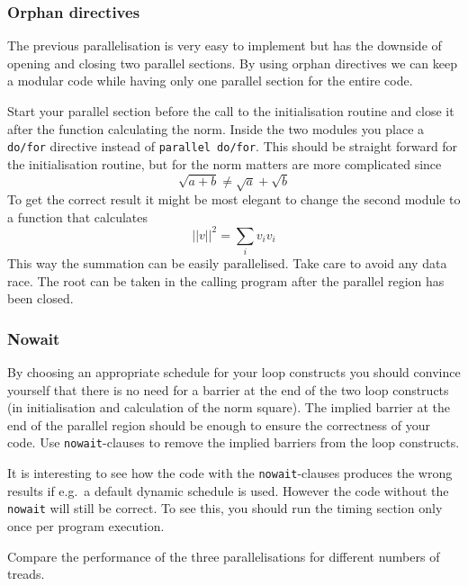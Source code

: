 \subsubsection{Orphan directives}
The previous parallelisation is very easy to implement but has the downside of opening and closing two parallel sections.  By using orphan directives we can keep a modular code while having only one parallel section for the entire code.

Start your parallel section before the call to the initialisation routine and close it after the function calculating the norm.  Inside the two modules you place a \verb+do/for+ directive instead of \verb+parallel do/for+.  This should be straight forward for the initialisation routine, but for the norm matters are more complicated since
\begin{equation}
\sqrt{a+b} \ne \sqrt a + \sqrt b
\end{equation}
To get the correct result it might be most elegant to change the second module to a function that calculates 
\begin{equation}
|| v ||^2 = \sum_i v_i v_i
\end{equation}
This way the summation can be easily parallelised.  Take care to avoid any data race.  The root can be taken in the calling program after the parallel region has been closed.

\subsubsection{Nowait}
By choosing an appropriate schedule for your loop constructs you should convince yourself that there is no need for a barrier at the end of the two loop constructs (in initialisation and calculation of the norm square).  The implied barrier at the end of the parallel region should be enough to ensure the correctness of your code.  Use \verb+nowait+-clauses to remove the implied barriers from the loop constructs.  

It is interesting to see how the code with the \verb+nowait+-clauses produces the wrong results if e.g.\ a default dynamic schedule is used.  However the code without the \verb+nowait+ will still be correct.  To see this, you should run the timing section only once per program execution.

Compare the performance of the three parallelisations for different numbers of treads.
